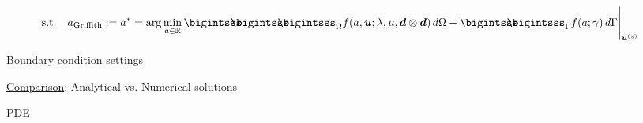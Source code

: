 \documentclass[25pt, a0paper,
portrait,
margin=2mm, 
innermargin=2mm, 
blockverticalspace=7mm, %
colspace=2mm, %
subcolspace=0mm]{tikzposter}
\makeatletter
\newcommand*{\inputfig}[3][htb]{{
    \def\fps@figure{#1}
    \def\DIR{#2}
    \def\LABEL{#3}
    \graphicspath{{\DIR/}}
    
}}
\newcommand{\WAsigma}{\prescript{\prescript{\mathcal{W}}{}{\!\!\!\mathcal{A}}}{}{\!\sigma}}
\makeatother
\begin{document}
{\begin{minipage}{0.43\textwidth}
\begin{mdframed}
\begin{align*}
				\text{s.t.}\quad
				 & a_{\text{Griffith}} := a^{*} = \arg\min_{a\in\mathbb{R}}{\bigintsss\!\!\!\!\!\!\bigintsss\!\!\!\!\!\!\bigintsss_{\Omega} f(a,\bm{u};\lambda,\mu,\bm{d}\otimes\bm{d}) \, d\Omega - \bigintsss\!\!\!\!\!\!\bigintsss_{\Gamma} f(a;\gamma) \, d\Gamma}\Bigg|_{\bm{u}^{(s)}}
			\end{align*}
		\end{mdframed}
	\end{minipage}
	\hfill
	\begin{minipage}{0.54\textwidth}
		\begin{minipage}{0.7\textwidth}
			\begin{mdframed}
				\underline{Boundary condition settings}
				\begin{center}
					\inputfig{floats/structuraltwofields}{structuraltwofields}
				\end{center}
			\end{mdframed}
			\begin{mdframed}
				\begin{center}
					\inputfig{floats/routine_woTV_numa_one}{routine_woTV_numa_one}
				\end{center}
				\underline{Comparison}: Analytical vs. Numerical solutions
				\begin{center}
					\inputfig{floats/comparison_ana_numa}{comparison_ana_numa}
				\end{center}
			\end{mdframed}
		\end{minipage}
		\hfill 
		\begin{minipage}{0.3\textwidth}
			\begin{mdframed}
				PDE
			\end{mdframed}
		\end{minipage}

\end{minipage}}
\end{document}
